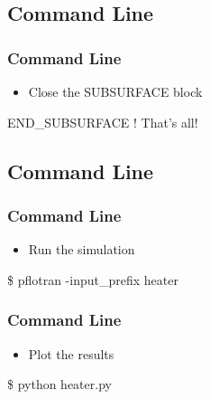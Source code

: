 \documentclass{beamer}
\newcommand\bluecomment[1]{{{\color{blue} #1}}}
\begin{document}
\subsection{Command Line}
\begin{frame}[fragile]\frametitle{Command Line}

\begin{itemize}
  \item Close the SUBSURFACE block
\end{itemize}

\begin{semiverbatim}
END_SUBSURFACE \bluecomment{! That's all!}
\end{semiverbatim}
\end{frame}

\subsection{Command Line}
\begin{frame}[fragile]\frametitle{Command Line}

\begin{itemize}
  \item Run the simulation
\end{itemize}

\begin{semiverbatim}
\$ pflotran -input_prefix heater
\end{semiverbatim}

\end{frame}

\begin{frame}[fragile]\frametitle{Command Line}

\begin{itemize}
  \item Plot the results
\end{itemize}

\begin{semiverbatim}
\$ python heater.py
\end{semiverbatim}

\end{frame}

\end{document}
